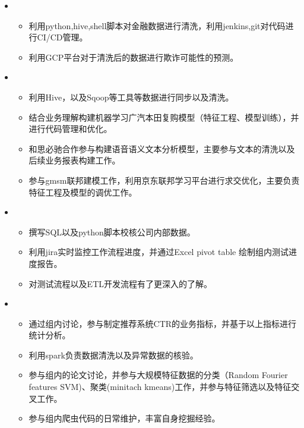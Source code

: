 
  \begin{itemize}[leftmargin=*]
         \item
           {\small
      \begin{itemize}
      \item 利用python,hive,shell脚本对金融数据进行清洗，利用jenkins,git对代码进行CI/CD管理。
          \item 利用GCP平台对于清洗后的数据进行欺诈可能性的预测。
            \end{itemize}
           }
       \item
           {\small
      \begin{itemize}
      \item 利用Hive，以及Sqoop等工具等数据进行同步以及清洗。
         \item 结合业务理解构建机器学习广汽本田复购模型（特征工程、模型训练），并进行代码管理和优化。
          \item 和思必驰合作参与构建语音语义文本分析模型，主要参与文本的清洗以及后续业务报表构建工作。
           \item 参与gmsm联邦建模工作，利用京东联邦学习平台进行求交优化，主要负责特征工程及模型的调优工作。
            \end{itemize}

             }
  \end{itemize}
  \begin{itemize}[leftmargin=*]
     \item
        {\small
      \begin{itemize}
      \item 撰写SQL以及python脚本校核公司内部数据。
        \item 利用jira实时监控工作流程进度，并通过Excel pivot table 绘制组内测试进度报告。
         \item 对测试流程以及ETL开发流程有了更深入的了解。
         
       \end{itemize}
       }
        \item
           {\small
      \begin{itemize}
      \item 通过组内讨论，参与制定推荐系统CTR的业务指标，并基于以上指标进行统计分析。
         \item 利用spark负责数据清洗以及异常数据的核验。
          \item 参与组内的论文讨论，并参与大规模特征数据的分类（Random Fourier features SVM)、聚类(minitach kmeans)工作，并参与特征筛选以及特征交叉工作。
           \item 参与组内爬虫代码的日常维护，丰富自身挖掘经验。

            \end{itemize}

             }

  \end{itemize}

